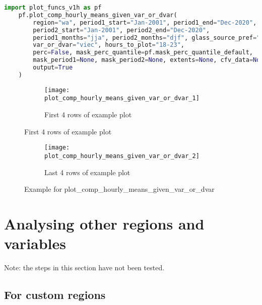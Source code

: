 \begin{lstlisting}[language=Python,caption={Example for plot\_comp\_hourly\_means\_given\_var\_or\_dvar},captionpos=b]
	import plot_funcs_v1h as pf
	pf.plot_comp_hourly_means_given_var_or_dvar(
		region="wa", period1_start="Jan-2001", period1_end="Dec-2020", 
		period2_start="Jan-2001", period2_end="Dec-2020", 
		period1_months="jja", period2_months="djf", glass_source_pref="modis", 
		var_or_dvar="viec", hours_to_plot="18-23", 
		perc=False, mask_perc_quantile=pf.mask_perc_quantile_default, 
		mask_period1=None, mask_period2=None, extents=None, cfv_data=None, 
		output=True
	)
\end{lstlisting}

\begin{figure}[!htp]
	\centering
	\begin{subfigure}[!htp]{0.9\textwidth}
		\centering
		\texttt{[image: plot\_comp\_hourly\_means\_given\_var\_or\_dvar\_1]}
		\caption[]{First 4 rows of example plot}
	\end{subfigure}
\end{figure}

\begin{figure}[!htp]\ContinuedFloat
	\begin{subfigure}[!htp]{0.9\textwidth}
		\centering
		\texttt{[image: plot\_comp\_hourly\_means\_given\_var\_or\_dvar\_2]}
		\caption[]{Last 4 rows of example plot}
	\end{subfigure}
	\caption{Example for plot\_comp\_hourly\_means\_given\_var\_or\_dvar}
	\label{fig:plot_comp_hourly_means_given_var_or_dvar}
\end{figure}

\section{Analysing other regions and variables}

Note: the steps in this section have not been tested.

\subsection{For custom regions}

